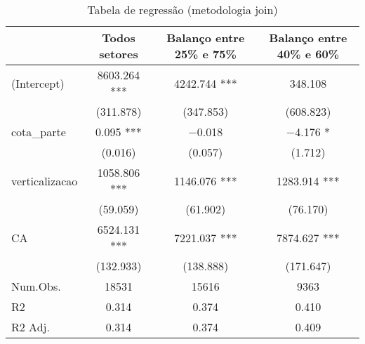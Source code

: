\begin{table}
\centering
\caption{Tabela de regressão (metodologia join)}
\centering
\begin{tabular}[t]{lccc}
\toprule
  & Todos setores & Balanço entre 25\% e 75\% & Balanço entre 40\% e 60\%\\
\midrule
(Intercept) & \num{8603.264} *** & \num{4242.744} *** & \num{348.108}\\
 & (\num{311.878}) & (\num{347.853}) & (\num{608.823})\\
cota\_parte & \num{0.095} *** & \num{-0.018} & \num{-4.176} *\\
 & (\num{0.016}) & (\num{0.057}) & (\num{1.712})\\
verticalizacao & \num{1058.806} *** & \num{1146.076} *** & \num{1283.914} ***\\
 & (\num{59.059}) & (\num{61.902}) & (\num{76.170})\\
CA & \num{6524.131} *** & \num{7221.037} *** & \num{7874.627} ***\\
 & (\num{132.933}) & (\num{138.888}) & (\num{171.647})\\
\midrule
Num.Obs. & \num{18531} & \num{15616} & \num{9363}\\
R2 & \num{0.314} & \num{0.374} & \num{0.410}\\
R2 Adj. & \num{0.314} & \num{0.374} & \num{0.409}\\
\bottomrule
\end{tabular}
\end{table}
